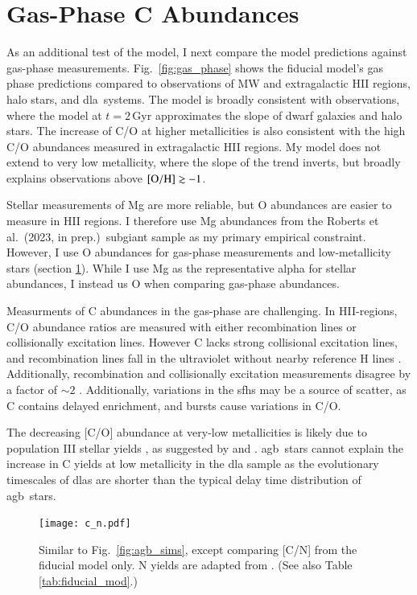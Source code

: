 \documentclass[12pt,oneside,letterpaper]{report}
\newcommand{\agb}{\gls{agb}}
\newcommand{\sfh}{\gls{sfh}}
\newcommand{\dla}{\gls{dla}}
\newcommand{\citetjack}{Roberts et al.~(2023, in prep.)}
\newcommand{\about}[1]{${\sim} #1$}
\begin{document}
\section{Gas-Phase C Abundances}\label{sec:gas}

As an additional test of the model, I next compare the model predictions against gas-phase measurements. Fig.~\ref{fig:gas_phase} shows the fiducial model's gas phase predictions compared to observations of MW and extragalactic HII regions, halo stars, and \dla\ systems. The model is broadly consistent with observations, where the model at $t=2$\,Gyr approximates the slope of dwarf galaxies and halo stars. The increase of C/O at higher metallicities is also consistent with the high C/O abundances measured in extragalactic HII regions. 
My model does not extend to very low metallicity, where the slope of the trend inverts, but broadly explains observations above $\rm [O/H] \gtrsim -1$. 

Stellar measurements of Mg are more reliable, but O abundances are easier to measure in HII regions.  I therefore use Mg abundances from the \citetjack~\gls{subgiant} sample as my primary empirical constraint. However, I use O abundances for gas-phase measurements and low-metallicity stars (section  \ref{sec:gas}). 
While I use Mg as the representative \gls{alpha} for stellar abundances, I instead us O when comparing gas-phase abundances.

Measurments of C abundances in the gas-phase are challenging. In HII-regions, C/O abundance ratios are measured with either recombination lines or collisionally excitation lines. However C lacks strong collisional excitation lines, and recombination lines fall in the ultraviolet without nearby reference H lines \citep{skillman+20}. Additionally, recombination and collisionally excitation measurements disagree by a factor of \about{2} \citep{GR07}.
Additionally, variations in the \sfh{}s may be a source of scatter, as C contains delayed enrichment, and bursts cause variations in C/O. 

The decreasing [C/O] abundance at very-low metallicities is likely due to population III stellar yields \citep[e.g.][]{hirschi07}, as suggested by \citet{cooke+17} and \citet{FN15}. \agb\ stars cannot explain the increase in C yields at low metallicity in the \dla{} sample as the evolutionary timescales of \dla{}s are shorter than the typical delay time distribution of \agb\ stars.

\begin{figure}[htp]
    \centering
    \texttt{[image: c\_n.pdf]}
    \caption[C/N abundance agreement]{Similar to Fig.~\ref{fig:agb_sims}, except comparing [C/N] from the fiducial model only. N yields are adapted from \cite{james+23}. (See also Table \ref{tab:fiducial_mod}.)
    }
\end{figure}
\end{document}
